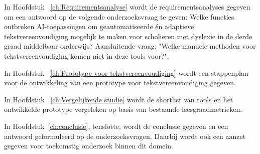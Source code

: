 In Hoofdstuk ~\ref{ch:Requirementsanalyse} wordt de requirementsanalyses gegeven om een antwoord op de volgende onderzoeksvraag te geven: Welke functies ontbreken AI-toepassingen om geautomatiseerde én adaptieve tekstvereenvoudiging mogelijk te maken voor \newline scholieren met dyslexie in de derde graad middelbaar onderwijs? Aansluitende vraag: "Welke manuele methoden voor tekstvereenvoudiging komen niet in deze tools voor?".

In Hoofdstuk ~\ref{ch:Prototype voor tekstvereenvoudiging} wordt een stappenplan voor de ontwikkeling van een prototype voor tekstvereenvoudiging gegeven.

In Hoofdstuk ~\ref{ch:Vergelijkende studie} wordt de shortlist van tools en het ontwikkelde prototype vergeleken op basis van bestaande leesgraadmetrieken.

In Hoofdstuk~\ref{ch:conclusie}, tenslotte, wordt de conclusie gegeven en een antwoord geformuleerd op de onderzoeksvragen. Daarbij wordt ook een aanzet gegeven voor toekomstig onderzoek binnen dit domein.